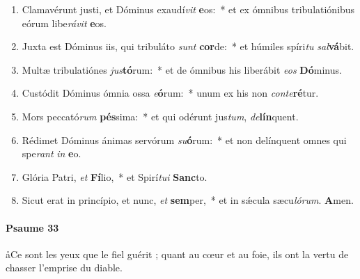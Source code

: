 \documentclass[twoside]{article}
\begin{document}
\begin{paracol}[1]{2}
\begin{enumerate}[wide, itemsep=0mm, labelwidth=!, labelindent=0pt, label=\color{gregoriocolor}\theenumi]
\item Clamavérunt justi, et Dóminus exaudí\textit{vit} \textbf{e}os:~* et ex ómnibus tribulatiónibus eórum libe\textit{rá}\textit{vit} \textbf{e}os.
\item Juxta est Dóminus iis, qui tribuláto \textit{sunt} \textbf{cor}de:~* et húmiles spíri\textit{tu} \textit{sal}\textbf{vá}bit.
\item Multæ tribulatiónes \textit{jus}\textbf{tó}rum:~* et de ómnibus his liberábit \textit{e}\textit{os} \textbf{Dó}minus.
\item Custódit Dóminus ómnia ossa \textit{e}\textbf{ó}rum:~* unum ex his non \textit{con}\textit{te}\textbf{ré}tur.
\item Mors peccató\textit{rum} \textbf{pés}sima:~* et qui odérunt jus\textit{tum}, \textit{de}\textbf{lín}quent.
\item Rédimet Dóminus ánimas servórum \textit{su}\textbf{ó}rum:~* et non delínquent omnes qui spe\textit{rant} \textit{in} \textbf{e}o.
\item Glória Patri, \textit{et} \textbf{Fí}lio,~* et Spirí\textit{tu}\textit{i} \textbf{Sanc}to.
\item Sicut erat in princípio, et nunc, \textit{et} \textbf{sem}per,~* et in sǽcula sæcu\textit{ló}\textit{rum}. \textbf{A}men.
\end{enumerate}

\switchcolumn

\paragraph{Psaume 33}
\aa Ce sont les yeux que le fiel guérit ; quant au cœur et au foie, ils ont la vertu de chasser l’emprise du diable.



\end{paracol}
\end{document}
